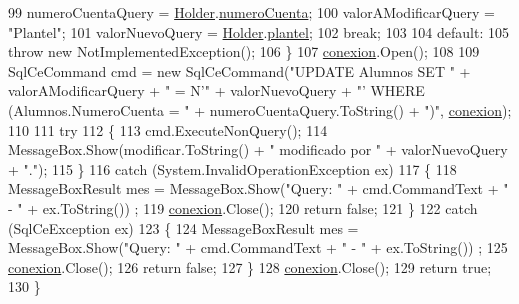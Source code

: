 \begin{DoxyCode}
99                     numeroCuentaQuery = \hyperlink{class_asistencias__wpf_1_1_asistente_d_b_manager_a4f73db2d92f913ccc8862126717968cd}{Holder}.\hyperlink{class_asistencias__wpf_1_1_asistente_a6d2aa009497445d62699e3c9d402ca78}{numeroCuenta};
100                     valorAModificarQuery = \textcolor{stringliteral}{"Plantel"};
101                     valorNuevoQuery = \hyperlink{class_asistencias__wpf_1_1_asistente_d_b_manager_a4f73db2d92f913ccc8862126717968cd}{Holder}.\hyperlink{class_asistencias__wpf_1_1_asistente_a4346dd7e16f0e8ef5de301d5e2b0439b}{plantel};
102                     \textcolor{keywordflow}{break};
103 
104                 \textcolor{keywordflow}{default}:
105                     \textcolor{keywordflow}{throw} \textcolor{keyword}{new} NotImplementedException();
106             \}
107             \hyperlink{class_asistencias__wpf_1_1_asistente_d_b_manager_a4ed268d53c358adfb5ca0185439bd6cf}{conexion}.Open();
108 
109             SqlCeCommand cmd = \textcolor{keyword}{new} SqlCeCommand(\textcolor{stringliteral}{"UPDATE Alumnos SET "} + valorAModificarQuery + \textcolor{stringliteral}{" = N'"} + 
      valorNuevoQuery + \textcolor{stringliteral}{"' WHERE (Alumnos.NumeroCuenta = "} + numeroCuentaQuery.ToString() + \textcolor{stringliteral}{")"}, 
      \hyperlink{class_asistencias__wpf_1_1_asistente_d_b_manager_a4ed268d53c358adfb5ca0185439bd6cf}{conexion});
110 
111             \textcolor{keywordflow}{try}
112             \{
113                 cmd.ExecuteNonQuery();
114                 MessageBox.Show(modificar.ToString() + \textcolor{stringliteral}{" modificado por "} + valorNuevoQuery + \textcolor{stringliteral}{"."});
115             \}
116             \textcolor{keywordflow}{catch} (System.InvalidOperationException ex)
117             \{
118                 MessageBoxResult mes = MessageBox.Show(\textcolor{stringliteral}{"Query: "} + cmd.CommandText + \textcolor{stringliteral}{" - "} + ex.ToString())
      ;
119                 \hyperlink{class_asistencias__wpf_1_1_asistente_d_b_manager_a4ed268d53c358adfb5ca0185439bd6cf}{conexion}.Close();
120                 \textcolor{keywordflow}{return} \textcolor{keyword}{false};
121             \}
122             \textcolor{keywordflow}{catch} (SqlCeException ex)
123             \{
124                 MessageBoxResult mes = MessageBox.Show(\textcolor{stringliteral}{"Query: "} + cmd.CommandText + \textcolor{stringliteral}{" - "} + ex.ToString())
      ;
125                 \hyperlink{class_asistencias__wpf_1_1_asistente_d_b_manager_a4ed268d53c358adfb5ca0185439bd6cf}{conexion}.Close();
126                 \textcolor{keywordflow}{return} \textcolor{keyword}{false};
127             \}
128             \hyperlink{class_asistencias__wpf_1_1_asistente_d_b_manager_a4ed268d53c358adfb5ca0185439bd6cf}{conexion}.Close();
129             \textcolor{keywordflow}{return} \textcolor{keyword}{true};
130         \}
\end{DoxyCode}
